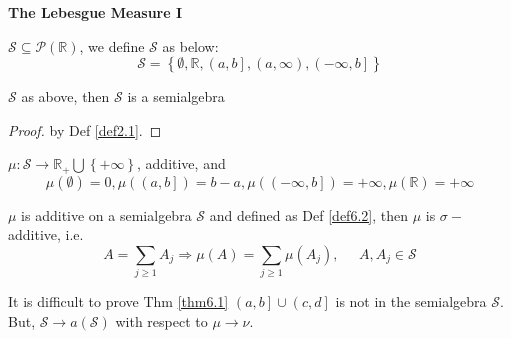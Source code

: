 \setcounter{lecture}{6}
\begin{center}
	\Large \bf The Lebesgue Measure I
\end{center}
\vspace{0.25cm}

\begin{definition}
	$ \mathcal{S} \subseteq \mathcal{P}(\mathbb{R}) $, we define $ \mathcal{S} $ as below:
	\begin{equation}
	\mathcal{S} = \left\{ {\emptyset ,\mathbb{R},\left( {a,b} \right],\left( {a,\infty } \right),\left( { - \infty ,b} \right]} \right\}
	\label{eq6.1}
	\end{equation}
	\label{def6.1}
\end{definition}

\begin{remark}
	$ \mathcal{S} $ as above, then $ \mathcal{S} $ is a semialgebra
\end{remark}

\begin{proof}
	by Def \ref{def2.1}.
\end{proof}

\begin{definition}
	$ \mu: \mathcal{S} \to \mathbb{R}_{+}\bigcup \left\{ { + \infty } \right\} $, additive, and
	\begin{equation}
	\mu \left( \emptyset  \right) = 0,\mu \left( {\left( {a,b} \right]} \right) = b - a,\mu \left( {\left( { - \infty ,b} \right]} \right) =  + \infty ,\mu \left( \mathbb{R} \right) =  + \infty 
	\label{eq6.2}
	\end{equation}
	\label{def6.2}
\end{definition}

\begin{theorem}
	$ \mu $ is additive on a semialgebra $ \mathcal{S} $ and defined as Def \ref{def6.2}, then $ \mu $ is $ \sigma- $additive, i.e.
	\begin{equation}
	A = \sum\limits_{j \geqslant 1} {{A_j}}  \Rightarrow \mu \left( A \right) = \sum\limits_{j \geqslant 1} {\mu \left( {{A_j}} \right)} ,\;\;\;\;\;A,{A_j} \in \mathcal{S}
	\label{eq6.3}
	\end{equation}
	\label{thm6.1}
\end{theorem}

\begin{remark}
	It is difficult to prove Thm \ref{thm6.1} $\left( {a,b} \right] \cup \left( {c,d} \right]$ is not in the semialgebra $ \mathcal{S} $. But, $ \mathcal{S} \to a(\mathcal{S}) $ with respect to  $ \mu \to \nu $.
	\label{rmk6.2}
\end{remark}

